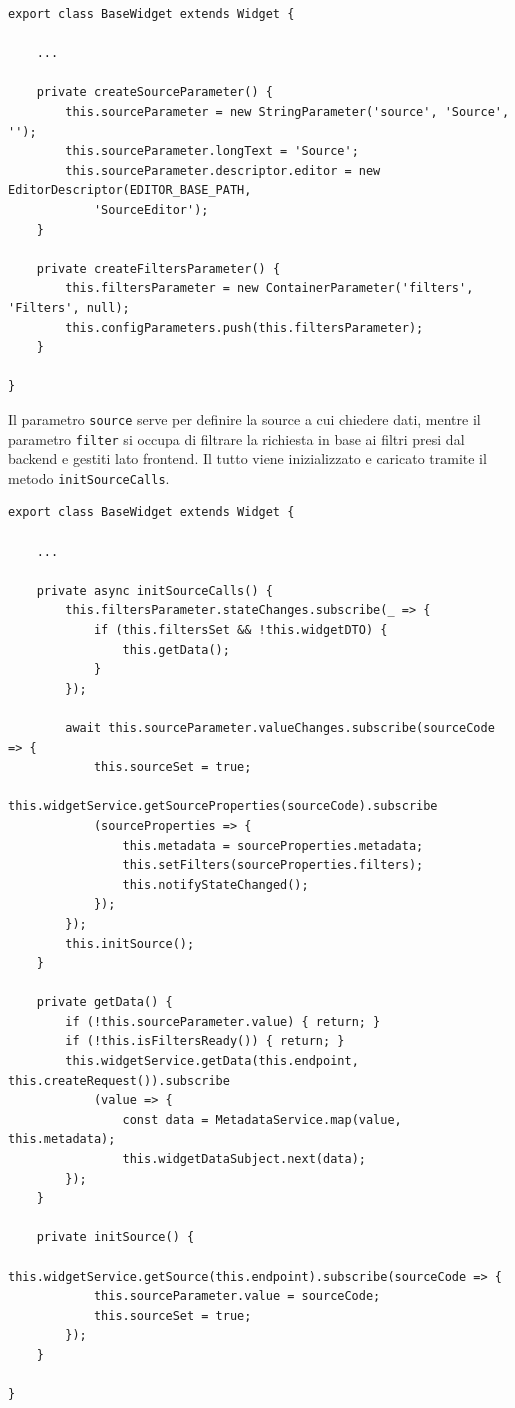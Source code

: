 \begin{lstlisting}[caption={Creazione dei parametri all'interno della classe BaseWidget}, style=javaScriptCode]
export class BaseWidget extends Widget {

    ...

    private createSourceParameter() {
        this.sourceParameter = new StringParameter('source', 'Source', '');
        this.sourceParameter.longText = 'Source';
        this.sourceParameter.descriptor.editor = new EditorDescriptor(EDITOR_BASE_PATH,
            'SourceEditor');
    }

    private createFiltersParameter() {
        this.filtersParameter = new ContainerParameter('filters', 'Filters', null);
        this.configParameters.push(this.filtersParameter);
    }

}
\end{lstlisting}
Il parametro \verb|source| serve per definire la source a cui chiedere dati, mentre il parametro \verb|filter| si occupa di filtrare la richiesta in base ai filtri presi dal backend e gestiti lato frontend. Il tutto viene inizializzato e caricato tramite il metodo \verb|initSourceCalls|.
\\
\begin{lstlisting}[caption={Inizializzazione dei parametri all'interno della classe BaseWidget}, style=javaScriptCode]
export class BaseWidget extends Widget {
    
    ...
    
    private async initSourceCalls() {
        this.filtersParameter.stateChanges.subscribe(_ => {
            if (this.filtersSet && !this.widgetDTO) {
                this.getData();
            }
        });

        await this.sourceParameter.valueChanges.subscribe(sourceCode => {
            this.sourceSet = true;
            this.widgetService.getSourceProperties(sourceCode).subscribe
            (sourceProperties => {
                this.metadata = sourceProperties.metadata;
                this.setFilters(sourceProperties.filters);
                this.notifyStateChanged();
            });
        });
        this.initSource();
    }

    private getData() {
        if (!this.sourceParameter.value) { return; }
        if (!this.isFiltersReady()) { return; }
        this.widgetService.getData(this.endpoint, this.createRequest()).subscribe
            (value => {
                const data = MetadataService.map(value, this.metadata);
                this.widgetDataSubject.next(data);
        });
    }

    private initSource() {
        this.widgetService.getSource(this.endpoint).subscribe(sourceCode => {
            this.sourceParameter.value = sourceCode;
            this.sourceSet = true;
        });
    }

}
\end{lstlisting}
